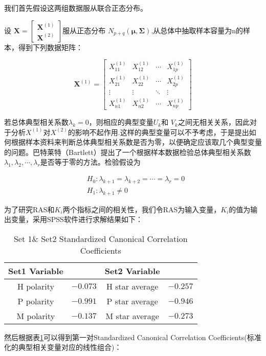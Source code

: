 \documentclass[UTF8]{article}
\begin{document}
我们首先假设这两组数据服从联合正态分布。

设 \(\mathbf{X}=\left[\begin{array}{l}
\mathbf{X}^{(1)} \\
\mathbf{X}^{(2)}
\end{array}\right]\)服从正态分布 \(N_{p+q}(\boldsymbol{\mu}, \boldsymbol{\Sigma})\),从总体中抽取样本容量为n的样本，得到下列数据矩阵：

\[\mathbf{X}^{(1)}=\left[\begin{array}{cccc}
X_{11}^{(1)} & X_{12}^{(1)} & \cdots & X_{1 p}^{(1)} \\
X_{21}^{(1)} & X_{22}^{(1)} & \cdots & X_{2 p}^{(1)} \\
\vdots & \vdots & \ddots & \vdots \\
X_{n 1}^{(1)} & X_{n 2}^{(1)} & \cdots & X_{n p}^{(1)}
\end{array}\right]\]

若总体典型相关系数\(\lambda_{k}=0\)，则相应的典型变量\(U_{k}\)和 \(V_{k}\)之间无相关关系，因此对于分析\(X^{(1)}\)对\(X^{(2)}\)的影响不起作用.这样的典型变量可以不予考虑，于是提出如何根据样本资料来判断总体典型相关系数是否为零，以便确定应该取几个典型变量的问题。巴特莱特（Bartlett）提出了一个根据样本数据检验总体典型相关系数\(\lambda_{1}, \lambda_{2}, \cdots, \lambda_{r}\)是否等于零的方法。检验假设为

\[\begin{aligned}
&H_{0}: \lambda_{k+1}=\lambda_{k+2}=\cdots=\lambda_{r}=0\\
&H_{1}: \lambda_{k+1} \neq 0
\end{aligned}\]

为了研究RAS和\(K_{i}\)两个指标之间的相关性，我们令RAS为输入变量，\(K_{i}\)的值为输出变量，采用SPSS软件进行求解结果如下：
\begin{table}[H]
	\centering
	\caption{Set 1$\&$ Set2 Standardized Canonical Correlation Coefficients}\label{q4b1}
	\begin{tabular}{cccc}
		\hline Set1 Variable &  & Set2 Variable &  \\
		\hline H polarity & $-0.073$ & H star average & $-0.257$ \\
		P polarity & $-0.991$ & P star average & $-0.946$ \\
		M polarity & $-0.137$ & M star average & $-0.273$ \\
		\hline
	\end{tabular}
\end{table}

然后根据表\ref{q4b1}可以得到第一对Standardized Canonical Correlation Coefficients(标准化的典型相关变量对应的线性组合)：
\end{document}
